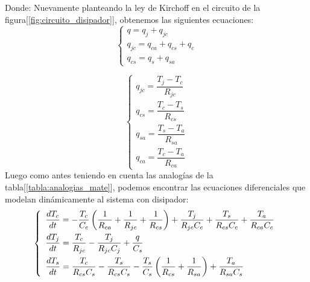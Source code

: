 \documentclass[10pt]{article}
\begin{document}
Donde:
Nuevamente planteando la ley de Kirchoff en el circuito de la figura[\ref{fig:circuito_disipador}], obtenemos las siguientes ecuaciones:
\begin{equation}
\label{eq:nodos_disipador}
   \left\{
      \begin{array}{ll}
         q=q_{j}+q_{jc}\\[10pt]
         q_{jc}=q_{ca}+q_{cs}+q_{c}\\[10pt]
         q_{cs}=q_s+q_{sa}
      \end{array}
   \right.
\end{equation}

\begin{equation}
\label{eq:nodos_disipador2}
   \left\{
      \begin{array}{ll}
         q_{jc}=\dfrac{T_j-T_c}{R_{jc}}\\[10pt]
         q_{cs}=\dfrac{T_c-T_s}{R_{cs}}\\[10pt]
         q_{sa}=\dfrac{T_s-T_a}{R_{sa}}\\[10pt]
         q_{ca}=\dfrac{T_c-T_a}{R_{ca}}
      \end{array}
   \right.
\end{equation}
Luego como antes teniendo en cuenta las analogías de la tabla[\ref{tabla:analogias_mate}], podemos encontrar las ecuaciones diferenciales que modelan dinámicamente
al sistema con disipador:
\begin{equation}
\medskip
\label{eq:diferenciales_disipador}
   \left\{
      \begin{array}{ll}
         \dfrac{dT_{c}}{dt}=-\dfrac{T_{c}}{C_{c}} \left(\dfrac{1}{R_{ca}} + \dfrac{1}{R_{jc}} +\dfrac{1}{R_{cs}}\right) + \dfrac{T_{j}}{R_{jc}C_{c}} + \dfrac{T_{s}}{R_{cs}C_{c}} + \dfrac{T_{a}}{R_{ca}C_{c}} \\[10pt]
         \dfrac{dT_{j}}{dt}=\dfrac{T_{c}}{R_{jc}} - \dfrac{T_{j}}{R_{jc}C_{j}} + \dfrac{q}{C_{s}}\\[10pt]
         \dfrac{dT_{s}}{dt}=\dfrac{T_{c}}{R_{cs}C_{s}}-\dfrac{T_{s}}{R_{cs}C_{s}} - \dfrac{T_{s}}{C_{s}}\left( \dfrac{1}{R_{cs}} + \dfrac{1}{R_{sa}}\right) + \dfrac{T_{a}}{R_{sa}C_{s}}
      \end{array}
   \right.
\end{equation}
\end{document}
